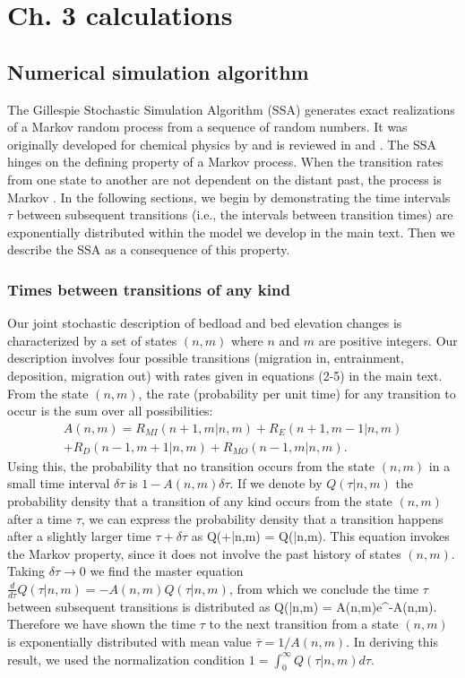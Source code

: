 

\chapter{Ch. 3 calculations}

\section{Numerical simulation algorithm}

The Gillespie Stochastic Simulation Algorithm (SSA) generates exact realizations of a Markov random process from a sequence of random numbers.
It was originally developed for chemical physics by \citet{Gillespie1977} and is reviewed in \citet{Gillespie1991} and \citet{Gillespie2007}.
The SSA hinges on the defining property of a Markov process. When the transition rates from one state to another are not dependent on the distant past, the process is Markov \citep[e.g.,][]{Cox1965}.
In the following sections, we begin by demonstrating the time intervals $\tau$ between subsequent transitions (i.e., the intervals between transition times) are exponentially distributed within the model we develop in the main text. Then we describe the SSA as a consequence of this property.

\subsection{Times between transitions of any kind}
Our joint stochastic description of bedload and bed elevation changes is characterized by a set of states $(n,m)$ where $n$ and $m$ are positive integers. 
Our description involves four possible transitions (migration in, entrainment, deposition, migration out) with rates given in equations (2-5) in the main text.
From the state $(n,m)$, the rate (probability per unit time) for any transition to occur is the sum over all possibilities:
\begin{multline} A(n,m) = R_{MI}(n+1,m|n,m) + R_E(n+1,m-1|n,m) \\+ R_D(n-1,m+1|n,m) + R_{MO}(n-1,m|n,m).\end{multline}
Using this, the probability that no transition occurs from the state $(n,m)$ in a small time interval $\delta \tau$ is $1-A(n,m)\delta \tau$. If we denote by $Q(\tau|n,m)$ the probability density that a transition of any kind occurs from the state $(n,m)$ after a time $\tau$, we can express the probability density that a transition happens after a slightly larger time $\tau + \delta \tau$ as 
\be Q(\tau+\delta \tau|n,m) = Q(\tau|n,m).\ee
This equation invokes the Markov property, since it does not involve the past history of states $(n,m)$. Taking $\delta\tau \rightarrow 0 $ we find the master equation $\frac{d}{d\tau}Q(\tau|n,m) = -A(n,m)Q(\tau|n,m)$, from which we conclude the time $\tau$ between subsequent transitions is distributed as 
\be Q(\tau|n,m) = A(n,m)e^{-A(n,m)\tau}. \label{eq:exp}\ee
Therefore we have shown the time $\tau$ to the next transition from a state $(n,m)$ is exponentially distributed with mean value $\bar{\tau} = 1/A(n,m).$ In deriving this result, we used the normalization condition $1 = \int_0^\infty Q(\tau|n,m)d\tau.$

